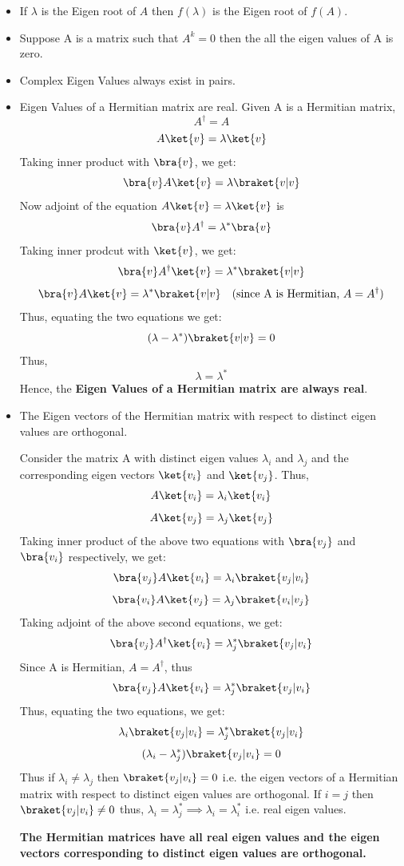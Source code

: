\documentclass[12pt, oneside]{book}
\theoremstyle{definition}
\theoremstyle{definition}
\theoremstyle{remark}
\begin{document}
\begin{itemize}
    \item If $\lambda$ is the Eigen root of $A$ then $f(\lambda)$ is the Eigen root of $f(A)$.
    \item Suppose A is a matrix such that $A^k=0$ then the all the eigen values of A is zero.
    \item Complex Eigen Values always exist in pairs.
    \item Eigen Values of a Hermitian matrix are real.
    Given A is a Hermitian matrix,
    \[ A^{\dagger}=A \]
    \[A\ket{v}=\lambda\ket{v} \]
    Taking inner product with $\bra{v}$, we get:
    \[\bra{v}A\ket{v}=\lambda\braket{v|v} \]
    Now adjoint of the equation $A\ket{v}=\lambda\ket{v}$ is
    \[ \bra{v}A^{\dagger}=\lambda^*\bra{v} \]
    Taking inner prodcut with $\ket{v}$, we get:
    \[ \bra{v}A^{\dagger}\ket{v}=\lambda^*\braket{v|v} \]
    \[ \bra{v}A\ket{v}=\lambda^*\braket{v|v} \quad \text{(since A is Hermitian, $A=A^{\dagger} $)}\]
    Thus, equating the two equations we get:
    \[ (\lambda - \lambda^*) \braket{v|v}=0 \]
    Thus,
    \[ \lambda=\lambda^* \]
    Hence, the \textbf{Eigen Values of a Hermitian matrix are always real}.
    \item The Eigen vectors of the Hermitian matrix with respect to distinct eigen values are orthogonal.
    
    Consider the matrix A with distinct eigen values $\lambda_i$ and $\lambda_j$ and the corresponding eigen vectors $\ket{v_i}$ and $\ket{v_j}$. Thus,
    \[ A\ket{v_i}=\lambda_i\ket{v_i} \]
    \[ A\ket{v_j}=\lambda_j\ket{v_j} \]
    Taking inner product of the above two equations with $\bra{v_j}$ and $\bra{v_i}$ respectively, we get:
    \[ \bra{v_j}A\ket{v_i}=\lambda_i\braket{v_j|v_i} \]
    \[ \bra{v_i}A\ket{v_j}=\lambda_j\braket{v_i|v_j} \]
    Taking adjoint of the above second equations, we get:
    \[ \bra{v_j}A^{\dagger}\ket{v_i}=\lambda_j^*\braket{v_j|v_i} \]
    Since A is Hermitian, $A=A^{\dagger}$, thus
    \[ \bra{v_j}A\ket{v_i}=\lambda_j^*\braket{v_j|v_i} \]
    Thus, equating the two equations, we get:
    \[ \lambda_i\braket{v_j|v_i}=\lambda_j^*\braket{v_j|v_i} \]
    \[ (\lambda_i-\lambda_j^*)\braket{v_j|v_i}=0 \]
    Thus if $\lambda_i \neq \lambda_j$ then $\braket{v_j|v_i}=0$ i.e. the eigen vectors of a Hermitian matrix with respect to distinct eigen values are orthogonal.
    If $i=j$ then $\braket{v_j|v_i} \neq 0$ thus, $\lambda_i=\lambda_j^* \implies \lambda_i=\lambda_i^*$ i.e. real eigen values.  

    \textbf{The Hermitian matrices have all real eigen values and the eigen vectors corresponding to distinct eigen values are orthogonal.}

\end{itemize}
\end{document}

